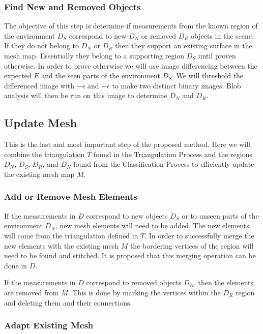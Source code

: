 \documentclass[12pt]{article}
\begin{document}
\subsubsection{Find New and Removed Objects}

The objective of this step is determine if measurements from the known
region of the environment $D_S$ correspond to new $D_N$ or removed $D_R$
objects in the scene. If they do not belong to $D_N$ or $D_R$ then they
support an existing surface in the mesh map. Essentially they belong to
a supporting region $D_S$ until proven otherwise. In order to prove
otherwise we will use image differencing between the expected $E$ and
the seen parts of the environment $D_S$. We will threshold the
differenced image with $-\epsilon$ and $+\epsilon$ to make two distinct
binary images. Blob analysis will then be run on this image to determine
$D_N$ and $D_R$.  

\subsection{Update Mesh}

This is the last and most important step of the proposed method. Here
we will combine the triangulation $T$ found in the Triangulation Process
and the regions $D_N$, $D_S$, $D_R$, and $D_N$ found from the
Classification Process to efficiently update the existing mesh map $M$. 

\subsubsection{Add or Remove Mesh Elements}

If the measurements in $D$ correspond to new objects $D_S$ or to unseen
parts of the environment $D_N$, new mesh elements will need to be added.
The new elements will come from the triangulation defined in $T$. In
order to successfully merge the new elements with the existing mesh $M$
the bordering vertices of the region will need to be found and stitched.
It is proposed that this merging operation can be done in $D$. 

If the measurements in $D$ correspond to removed objects $D_R$, then the
elements are removed from $M$. This is done by marking the vertices
within the $D_R$ region and deleting them and their connections.  

\subsubsection{Adapt Existing Mesh}
\end{document}
